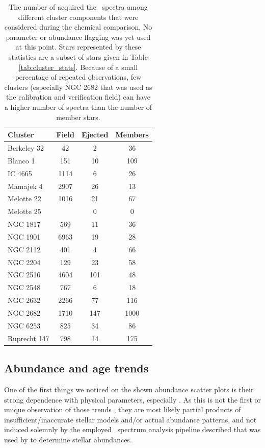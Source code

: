 \begin{table}
	\centering
	\caption{The number of acquired the \Gh\ spectra among different cluster components that were considered during the chemical comparison. No parameter or abundance flagging was yet used at this point. Stars represented by these statistics are a subset of stars given in Table \ref{tab:cluster_stats}. Because of a small percentage of repeated observations, few clusters (especially NGC 2682 that was used as the calibration and verification field) can have a higher number of spectra than the number of member stars.}
	\begin{tabular}{l | c | c | c }
		\hline
		Cluster & Field & Ejected & Members \\
		\hline
		Berkeley 32  & 42 & 2 & 36 \\ 
		Blanco 1     & 151 & 10 & 109 \\
		IC 4665      & 1114 & 6 & 26 \\
		Mamajek 4    & 2907 & 26 & 13 \\
		Melotte 22   & 1016 & 21 & 67 \\
		Melotte 25   & \rb{TBD} & 0 & 0 \\
		NGC 1817     & 569 & 11 & 36 \\
		NGC 1901     & 6963 & 19 & 28 \\
		NGC 2112     & 401 & 4 & 66 \\
		NGC 2204     & 129 & 23 & 58 \\
		NGC 2516     & 4604 & 101 & 48 \\
		NGC 2548     & 767 & 6 & 18 \\
		NGC 2632     & 2266 & 77 & 116 \\
		NGC 2682     & 1710 & 147 & 1000 \\
		NGC 6253     & 825 & 34 & 86 \\
		Ruprecht 147 & 798 & 14 & 175 \\
		\hline
	\end{tabular}
	\label{tab:cluster_stats_abund}
\end{table}

\subsection{Abundance and age trends}
\label{sec:abund_trends}
One of the first things we noticed on the shown abundance scatter plots is their strong dependence with physical parameters, especially \Teff. As this is not the first or unique observation of those trends \cite{2010A&A...523A..71G, 2013ApJ...775...58B, 2016MNRAS.457.3934L, 2018A&A...619A.176B, 2019arXiv191208539C}, they are most likely partial products of insufficient/inaccurate stellar models and/or actual abundance patterns, and not induced solemnly by the employed \SME\ spectrum analysis pipeline described that was used by \citet{buder2020} to determine stellar abundances.

